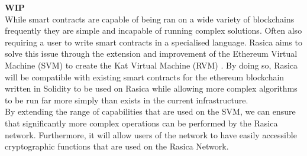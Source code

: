 \textbf{WIP} \\

While smart contracts are capable of being ran on a wide variety of blockchains frequently they are simple and incapable of running complex solutions. Often also requiring a user to write smart contracts in a specialised language. Rasica aims to solve this issue through the extension and improvement of the Ethereum Virtual Machine (SVM) to create the Kat Virtual Machine (RVM) \cite{RVM}. By doing so, Rasica will be compatible with existing smart contracts for the ethereum blockchain written in Solidity to be used on Rasica while allowing more complex algorithms to be run far more simply than exists in the current infrastructure. \\

By extending the range of capabilities that are used on the SVM, we can ensure that significantly more complex operations can be performed by the Rasica network. Furthermore, it will allow users of the network to have easily accessible cryptographic functions that are used on the Rasica Network.  
